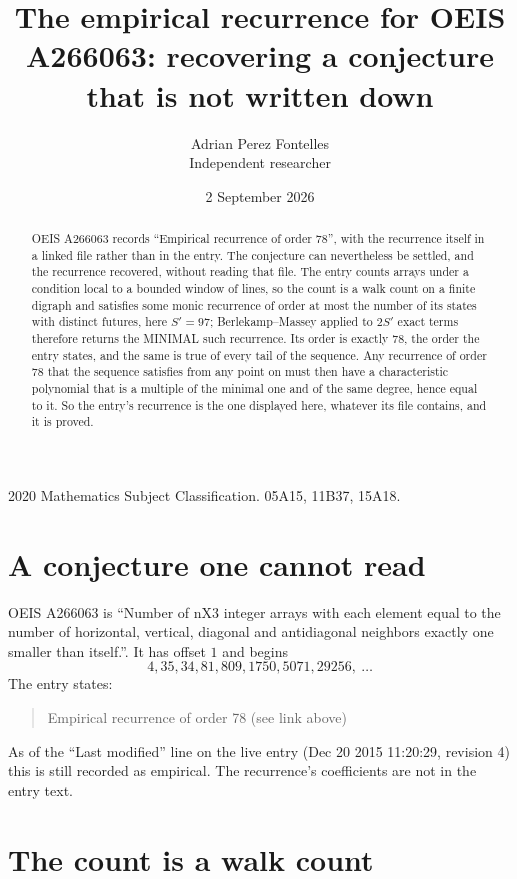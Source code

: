 \documentclass[11pt,a4paper]{article}
\title{The empirical recurrence for OEIS A266063: recovering a conjecture that is not written down}
\author{Adrian Perez Fontelles\\ \small Independent researcher}
\date{2 September 2026}
\theoremstyle{plain}
\theoremstyle{definition}
\begin{document}
\maketitle

\begin{abstract}
OEIS A266063 records ``Empirical recurrence of order $78$'', with the recurrence itself in a
linked file rather than in the entry. The conjecture can nevertheless be settled, and the
recurrence recovered, without reading that file. The entry counts arrays under a condition
local to a bounded window of lines, so the count is a walk count on a finite digraph and
satisfies some monic recurrence of order at most the number of its states with distinct
futures, here $S'=97$; Berlekamp--Massey applied to $2S'$ exact
terms therefore returns the MINIMAL such recurrence. Its order is exactly $78$, the order
the entry states, and the same is true of every tail of the sequence. Any recurrence of order
$78$ that the sequence satisfies from any point on must then have a characteristic
polynomial that is a multiple of the minimal one and of the same degree, hence equal to it. So
the entry's recurrence is the one displayed here, whatever its file contains, and it is
proved.
\end{abstract}

\noindent\small 2020 Mathematics Subject Classification. 05A15, 11B37, 15A18.\normalsize

\section{A conjecture one cannot read}

OEIS A266063 is ``Number of nX3 integer arrays with each element equal to the number of horizontal, vertical, diagonal and antidiagonal neighbors exactly one smaller than itself.''. It has offset $1$ and begins
\[
4, 35, 34, 81, 809, 1750, 5071, 29256,\ \dots
\]
The entry states:
\begin{quote}
Empirical recurrence of order 78 (see link above)
\end{quote}
As of the ``Last modified'' line on the live entry (Dec 20 2015 11:20:29, revision 4) this is still
recorded as empirical. The recurrence's coefficients are not in the entry text.

\section{The count is a walk count}
\end{document}
